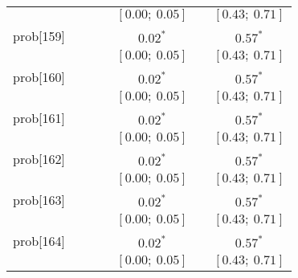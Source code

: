 \begin{table}
\begin{center}
\begin{tabular}{l c c c c c c }
          &                           &                           &                           & $[0.00;\ 0.05]$         &                           & $[0.43;\ 0.71]$       \\
prob[159] &                           &                           &                           & $0.02^{*}$              &                           & $0.57^{*}$            \\
          &                           &                           &                           & $[0.00;\ 0.05]$         &                           & $[0.43;\ 0.71]$       \\
prob[160] &                           &                           &                           & $0.02^{*}$              &                           & $0.57^{*}$            \\
          &                           &                           &                           & $[0.00;\ 0.05]$         &                           & $[0.43;\ 0.71]$       \\
prob[161] &                           &                           &                           & $0.02^{*}$              &                           & $0.57^{*}$            \\
          &                           &                           &                           & $[0.00;\ 0.05]$         &                           & $[0.43;\ 0.71]$       \\
prob[162] &                           &                           &                           & $0.02^{*}$              &                           & $0.57^{*}$            \\
          &                           &                           &                           & $[0.00;\ 0.05]$         &                           & $[0.43;\ 0.71]$       \\
prob[163] &                           &                           &                           & $0.02^{*}$              &                           & $0.57^{*}$            \\
          &                           &                           &                           & $[0.00;\ 0.05]$         &                           & $[0.43;\ 0.71]$       \\
prob[164] &                           &                           &                           & $0.02^{*}$              &                           & $0.57^{*}$            \\
          &                           &                           &                           & $[0.00;\ 0.05]$         &                           & $[0.43;\ 0.71]$       \\

\end{tabular}
\end{center}
\end{table}
